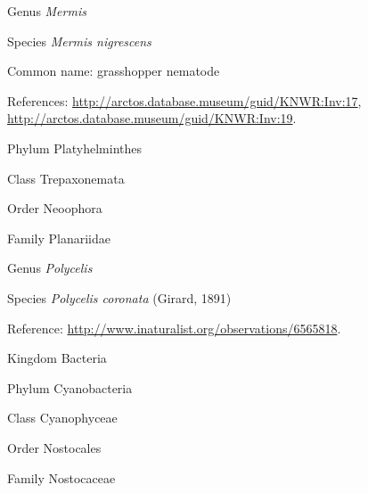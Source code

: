 \documentclass[9pt, article]{memoir}
\begin{document}
\begin{multicols}{2}
\vspace{6pt}\noindent\hspace{30pt}Genus \textit{Mermis}


\vspace{6pt}\noindent\hspace{36pt}Species \textit{Mermis nigrescens}


Common name: grasshopper nematode

References: 
\url{http://arctos.database.museum/guid/KNWR:Inv:17}, 
\url{http://arctos.database.museum/guid/KNWR:Inv:19}.

\vspace{6pt}\noindent\hspace{6pt}Phylum Platyhelminthes


\vspace{6pt}\noindent\hspace{12pt}Class Trepaxonemata


\vspace{6pt}\noindent\hspace{18pt}Order Neoophora


\vspace{6pt}\noindent\hspace{24pt}Family Planariidae


\vspace{6pt}\noindent\hspace{30pt}Genus \textit{Polycelis}


\vspace{6pt}\noindent\hspace{36pt}Species \textit{Polycelis coronata} (Girard, 1891)


Reference: 
\url{http://www.inaturalist.org/observations/6565818}.

\vspace{6pt}\noindent\hspace{0pt}Kingdom Bacteria


\vspace{6pt}\noindent\hspace{6pt}Phylum Cyanobacteria


\vspace{6pt}\noindent\hspace{12pt}Class Cyanophyceae


\vspace{6pt}\noindent\hspace{18pt}Order Nostocales


\vspace{6pt}\noindent\hspace{24pt}Family Nostocaceae



\end{multicols}
\end{document}
